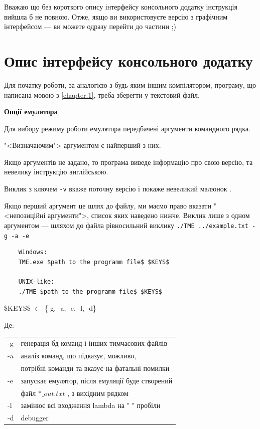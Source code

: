 \documentclass[oneside,final,14pt]{extreport}
\begin{document}
Вважаю що без короткого опису інтерфейсу консольного додатку інструкція вийшла б не повною. Отже, якщо ви використовуєте версію з графічним інтерфейсом --- ви можете одразу перейти до частини ;)

\section{Опис інтерфейсу консольного додатку}
Для початку роботи, за аналогією з будь-яким іншим компілятором, програму, що написана мовою з \ref{chapter:1}, треба зберегти у текстовий файл.

\bigskip

{ \bf Опції емулятора }
	
 Для вибору режиму роботи емулятора передбачені аргументи командного рядка.
	
"<Визначаючим"> аргументом є найперший з них.
		
Якщо аргументів не задано, то програма виведе інформацію про свою версію, та невелику інструкцію англійською.

Виклик з ключем \texttt{-v} вкаже поточну версію і покаже невеликий малюнок \smiley{}.

Якщо перший аргумент це шлях до файлу, ми маємо право вказати "<непозиційні аргументи">, список яких наведено нижче. Виклик лише з одном аргументом --- шляхом до файла рівносильний виклику \texttt{./TME ../example.txt -g -a -e}
		
		
\begin{tcolorbox}	
\begin{verbatim}
	Windows:
	TME.exe $path to the programm file$ $KEYS$

	UNIX-like:
	./TME $path to the programm file$ $KEYS$
\end{verbatim}
\end{tcolorbox}
		

\$KEYS\$ $\subset$ \{-g, -a, -e, -l, -d\}
			
		
		Де:
		
		
\begin{tabular}{ l l }
	-g & генерація бд команд і інших тимчасових файлів \\
	-a & аналіз команд, що підказує, можливо, \\
	   & потрібні команди та вказує на фатальні помилки \\
	-e & запускає емулятор, після емуляції буде створений\\
	   &  файл $*\_out.txt$ , з вихідним рядком \\
	-l & замінює всі входження lambda на " " пробіли\\
	-d & debugger\\ 
\end{tabular}
\end{document}
